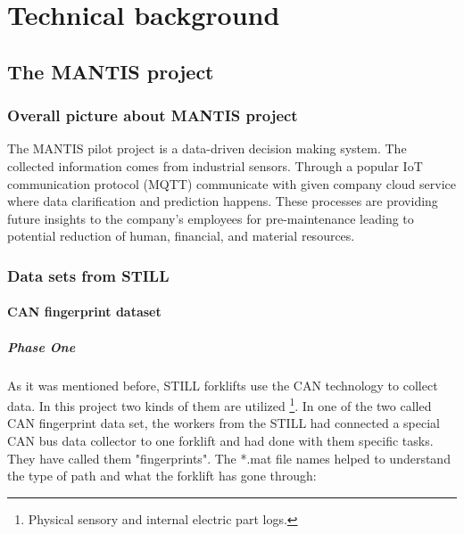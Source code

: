 \chapter{Technical background}
	\section{The MANTIS project}
		\subsection{Overall picture about MANTIS project}
The MANTIS pilot project is a data-driven decision making system. The collected information comes from industrial sensors. Through a popular IoT communication protocol (MQTT) communicate with given company cloud service where data clarification and prediction happens. These processes are providing future insights to the company's employees for pre-maintenance leading to potential reduction of human, financial, and material resources.\cite{Mantis}

		\subsection{Data sets from STILL}
			\subsubsection{CAN fingerprint dataset}
				\paragraph{Phase One}
				\noindent
As it was mentioned before, STILL forklifts \cite{RX20} use the CAN technology to collect data. In this project two kinds of them are utilized \footnote{Physical sensory and internal electric part logs.}. In one of the two called CAN fingerprint data set, the workers from the STILL had connected a special CAN bus data collector to one forklift and had done with them specific tasks. They have called them "fingerprints". The *.mat file names helped to understand the type of path and what the forklift has gone through:

